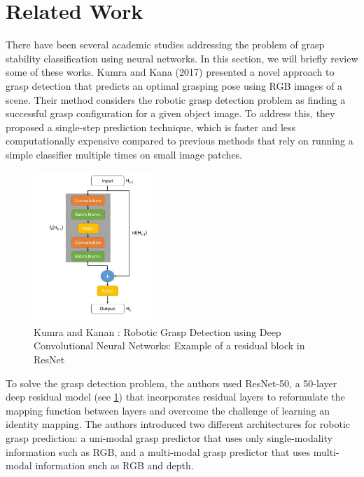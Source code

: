 \documentclass[11pt, a4paper]{report}
\begin{document}
\section{Related Work}\label{sec:5.1}
There have been several academic studies addressing the problem of grasp stability classification using neural networks. In this section, we will briefly review some of these works. Kumra and Kana (2017) \cite{8202237} presented a novel approach to grasp detection that predicts an optimal grasping pose using RGB images of a scene. Their method considers the robotic grasp detection problem as finding a successful grasp configuration for a given object image. To address this, they proposed a single-step prediction technique, which is faster and less computationally expensive compared to previous methods that rely on running a simple classifier multiple times on small image patches.
\begin{figure}[H]
    \centering
    \includegraphics[width=0.4\textwidth]{docs/Project Report/Media/5_1_kumra_kana_2017_residual_block.png}
    \caption{Kumra and Kanan \cite{8202237}: Robotic Grasp Detection using Deep Convolutional Neural Networks: Example of a residual block in ResNet}
    \label{fig:5.1}
\end{figure}
To solve the grasp detection problem, the authors used ResNet-50, a 50-layer deep residual model (see \ref{fig:5.1}) that incorporates residual layers to reformulate the mapping function between layers and overcome the challenge of learning an identity mapping. The authors introduced two different architectures for robotic grasp prediction: a uni-modal grasp predictor that uses only single-modality information such as RGB, and a multi-modal grasp predictor that uses multi-modal information such as RGB and depth.\\
\end{document}
